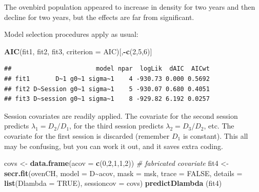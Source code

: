 \documentclass[
]{book}
\newenvironment{Shaded}{\begin{snugshade}}{\end{snugshade}}
\newcommand{\AttributeTok}[1]{\textcolor[rgb]{0.13,0.29,0.53}{#1}}
\newcommand{\CommentTok}[1]{\textcolor[rgb]{0.56,0.35,0.01}{\textit{#1}}}
\newcommand{\ConstantTok}[1]{\textcolor[rgb]{0.56,0.35,0.01}{#1}}
\newcommand{\DecValTok}[1]{\textcolor[rgb]{0.00,0.00,0.81}{#1}}
\newcommand{\FunctionTok}[1]{\textcolor[rgb]{0.13,0.29,0.53}{\textbf{#1}}}
\newcommand{\NormalTok}[1]{#1}
\newcommand{\OtherTok}[1]{\textcolor[rgb]{0.56,0.35,0.01}{#1}}
\newcommand{\SpecialCharTok}[1]{\textcolor[rgb]{0.81,0.36,0.00}{\textbf{#1}}}
\newcommand{\StringTok}[1]{\textcolor[rgb]{0.31,0.60,0.02}{#1}}
\begin{document}
The ovenbird population appeared to increase in density for two years and then decline for two years, but the effects are far from significant.

Model selection procedures apply as usual:

\begin{Shaded}
\begin{Highlighting}[]
 \FunctionTok{AIC}\NormalTok{(fit1, fit2, fit3, }\AttributeTok{criterion =} \StringTok{\textquotesingle{}AIC\textquotesingle{}}\NormalTok{)[,}\SpecialCharTok{{-}}\FunctionTok{c}\NormalTok{(}\DecValTok{2}\NormalTok{,}\DecValTok{5}\NormalTok{,}\DecValTok{6}\NormalTok{)]}
\end{Highlighting}
\end{Shaded}

\begin{verbatim}
##                       model npar  logLik  dAIC  AICwt
## fit1       D~1 g0~1 sigma~1    4 -930.73 0.000 0.5692
## fit2 D~Session g0~1 sigma~1    5 -930.07 0.680 0.4051
## fit3 D~session g0~1 sigma~1    8 -929.82 6.192 0.0257
\end{verbatim}

Session covariates are readily applied. The covariate for the second session predicts \(\lambda_1 = D_2/D_1\), for the third session predicts \(\lambda_2 = D_3/D_2\), etc. The covariate for the first session is discarded (remember \(D_1\) is constant). This all may be confusing, but you can work it out, and it saves extra coding.

\begin{Shaded}
\begin{Highlighting}[]
\NormalTok{covs }\OtherTok{\textless{}{-}} \FunctionTok{data.frame}\NormalTok{(}\AttributeTok{acov =} \FunctionTok{c}\NormalTok{(}\DecValTok{0}\NormalTok{,}\DecValTok{2}\NormalTok{,}\DecValTok{1}\NormalTok{,}\DecValTok{1}\NormalTok{,}\DecValTok{2}\NormalTok{))  }\CommentTok{\# fabricated covariate}
\NormalTok{fit4  }\OtherTok{\textless{}{-}} \FunctionTok{secr.fit}\NormalTok{(ovenCH, }\AttributeTok{model =}\NormalTok{ D}\SpecialCharTok{\textasciitilde{}}\NormalTok{acov, }\AttributeTok{mask =}\NormalTok{ msk, }
    \AttributeTok{trace =} \ConstantTok{FALSE}\NormalTok{, }\AttributeTok{details =} \FunctionTok{list}\NormalTok{(}\AttributeTok{Dlambda =} \ConstantTok{TRUE}\NormalTok{), }
    \AttributeTok{sessioncov =}\NormalTok{ covs)}
 \FunctionTok{predictDlambda}\NormalTok{ (fit4)}
\end{Highlighting}
\end{Shaded}
\end{document}
